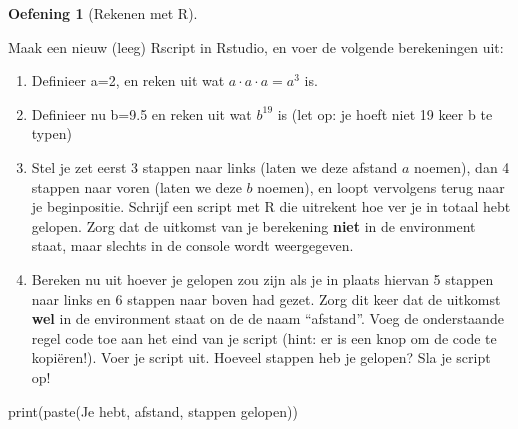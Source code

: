 \documentclass[
  a4paper,
]{scrbook}
\newenvironment{Shaded}{\begin{snugshade}}{\end{snugshade}}
\newcommand{\FunctionTok}[1]{\textcolor[rgb]{0.28,0.35,0.67}{#1}}
\newcommand{\NormalTok}[1]{\textcolor[rgb]{0.00,0.23,0.31}{#1}}
\newcommand{\StringTok}[1]{\textcolor[rgb]{0.13,0.47,0.30}{#1}}
\providecommand{\tightlist}{%
  \setlength{\itemsep}{0pt}\setlength{\parskip}{0pt}}\usepackage{longtable,booktabs,array}
\theoremstyle{definition}
\newtheorem{exercise}{Oefening}[chapter]
\theoremstyle{remark}
\begin{document}
\begin{exercise}[Rekenen met
R]\protect\hypertarget{exr-rekenenmetR}{}\label{exr-rekenenmetR}

Maak een nieuw (leeg) Rscript in Rstudio, en voer de volgende
berekeningen uit:

\begin{enumerate}
\def\labelenumi{\alph{enumi}.}
\tightlist
\item
  Definieer a=2, en reken uit wat \(a \cdot a \cdot a = a^3\) is.
\item
  Definieer nu b=9.5 en reken uit wat \(b^{19}\) is (let op: je hoeft
  niet 19 keer b te typen)
\item
  Stel je zet eerst 3 stappen naar links (laten we deze afstand \(a\)
  noemen), dan 4 stappen naar voren (laten we deze \(b\) noemen), en
  loopt vervolgens terug naar je beginpositie. Schrijf een script met R
  die uitrekent hoe ver je in totaal hebt gelopen. Zorg dat de uitkomst
  van je berekening \textbf{niet} in de environment staat, maar slechts
  in de console wordt weergegeven.
\item
  Bereken nu uit hoever je gelopen zou zijn als je in plaats hiervan 5
  stappen naar links en 6 stappen naar boven had gezet. Zorg dit keer
  dat de uitkomst \textbf{wel} in de environment staat on de de naam
  ``afstand''. Voeg de onderstaande regel code toe aan het eind van je
  script (hint: er is een knop om de code te kopiëren!). Voer je script
  uit. Hoeveel stappen heb je gelopen? Sla je script op!
\end{enumerate}

\begin{Shaded}
\begin{Highlighting}[]
\FunctionTok{print}\NormalTok{(}\FunctionTok{paste}\NormalTok{(}\StringTok{\textquotesingle{}Je hebt\textquotesingle{}}\NormalTok{, afstand, }\StringTok{\textquotesingle{}stappen gelopen\textquotesingle{}}\NormalTok{))}
\end{Highlighting}
\end{Shaded}

\end{exercise}
\end{document}

